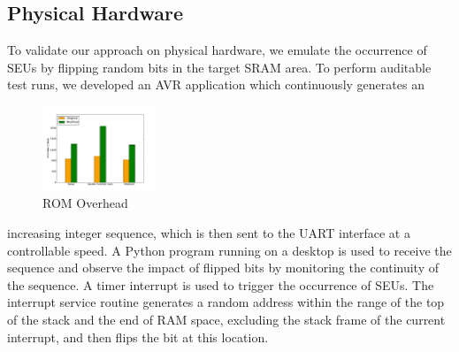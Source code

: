 \subsection{Physical Hardware}
\vspace{-5pt}
To validate our approach on physical hardware, we emulate the occurrence of SEUs by flipping random bits in the target SRAM area. To perform auditable test runs, we developed an AVR application which continuously generates an 
\begin{figure}
	\vspace{-30pt}
	\begin{center}
		\includegraphics[width=0.3\textwidth]{figures/space_overhead.pdf}
	\end{center}
	\vspace{-15pt}
	\caption{ROM Overhead}
	\vspace{-20pt}
	\label{fig:space_overhead}
\end{figure}
increasing integer sequence, which is then sent to the UART interface at a controllable speed. A Python program running on a desktop is used to receive the sequence and observe the impact of flipped bits by monitoring the continuity of the sequence. A timer interrupt is used to trigger the occurrence of SEUs. The interrupt service routine generates a random address within the range of the top of the stack and the end of RAM space, excluding the stack frame of the current interrupt, and then flips the bit at this location. 

